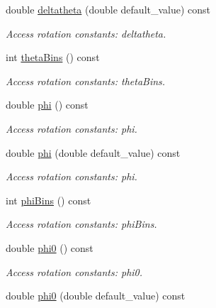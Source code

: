 \begin{DoxyCompactItemize}
double \hyperlink{struct_d_d4hep_1_1_x_m_l_1_1_dimension_ae67e203f11e58ff9e7a0d8e051914fbe}{deltatheta} (double default\_\-value) const 
\begin{DoxyCompactList}\small\item\em Access rotation constants: deltatheta. \item\end{DoxyCompactList}\item 
int \hyperlink{struct_d_d4hep_1_1_x_m_l_1_1_dimension_a9a371dba3c61c7e5957ad0177cda2248}{thetaBins} () const 
\begin{DoxyCompactList}\small\item\em Access rotation constants: thetaBins. \item\end{DoxyCompactList}\item 
double \hyperlink{struct_d_d4hep_1_1_x_m_l_1_1_dimension_acb10ddbcff35704b49b4f03a7eef4e37}{phi} () const 
\begin{DoxyCompactList}\small\item\em Access rotation constants: phi. \item\end{DoxyCompactList}\item 
double \hyperlink{struct_d_d4hep_1_1_x_m_l_1_1_dimension_aa106c5202afcad00c7b5e79f4228dcd1}{phi} (double default\_\-value) const 
\begin{DoxyCompactList}\small\item\em Access rotation constants: phi. \item\end{DoxyCompactList}\item 
int \hyperlink{struct_d_d4hep_1_1_x_m_l_1_1_dimension_a081b3802be576b9ef2971fda9e671cd1}{phiBins} () const 
\begin{DoxyCompactList}\small\item\em Access rotation constants: phiBins. \item\end{DoxyCompactList}\item 
double \hyperlink{struct_d_d4hep_1_1_x_m_l_1_1_dimension_afeace187ac0a04a87394ee5434fb12ba}{phi0} () const 
\begin{DoxyCompactList}\small\item\em Access rotation constants: phi0. \item\end{DoxyCompactList}\item 
double \hyperlink{struct_d_d4hep_1_1_x_m_l_1_1_dimension_ad74bd67752b128af2001a6069777b92f}{phi0} (double default\_\-value) const 

\end{DoxyCompactItemize}
